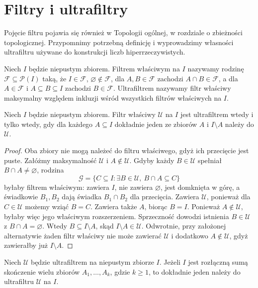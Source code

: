 \section{Filtry i ultrafiltry}
\label{ma1:sec:ultrafilters}
Pojęcie filtru pojawia się również w Topologii ogólnej, w rozdziale o zbieżności topologicznej. Przypomnimy potrzebną definicję i wyprowadzimy własności ultrafiltru używane do konstrukcji liczb hiperrzeczywistych.
\begin{definicja}
\label{ma1:def:ultrafilter}
Niech $I$ będzie niepustym zbiorem. Filtrem właściwym na $I$ nazywamy rodzinę $\mathcal F\subseteq\mathcal P(I)$ taką, że $I\in\mathcal F$, $\varnothing\notin\mathcal F$, dla $A,B\in\mathcal F$ zachodzi $A\cap B\in\mathcal F$, a dla $A\in\mathcal F$ i $A\subseteq B\subseteq I$ zachodzi $B\in\mathcal F$. Ultrafiltrem nazywamy filtr właściwy maksymalny względem inkluzji wśród wszystkich filtrów właściwych na $I$.
\end{definicja}
\begin{lemat}
\label{ma1:lem:ultrafilter-alternative}
Niech $I$ będzie niepustym zbiorem. Filtr właściwy $\mathcal U$ na $I$ jest ultrafiltrem wtedy i tylko wtedy, gdy dla każdego $A\subseteq I$ dokładnie jeden ze zbiorów $A$ i $I\setminus A$ należy do $\mathcal U$.
\end{lemat}
\begin{proof}
Oba zbiory nie mogą należeć do filtru właściwego, gdyż ich przecięcie jest puste. Załóżmy maksymalność $\mathcal U$ i $A\notin\mathcal U$. Gdyby każdy $B\in\mathcal U$ spełniał $B\cap A\ne\varnothing$, rodzina
\[
 \mathcal G=\{C\subseteq I:\exists B\in\mathcal U,\ B\cap A\subseteq C\}
\]
byłaby filtrem właściwym: zawiera $I$, nie zawiera $\varnothing$, jest domknięta w górę, a świadkowie $B_1,B_2$ dają świadka $B_1\cap B_2$ dla przecięcia. Zawiera $\mathcal U$, ponieważ dla $C\in\mathcal U$ możemy wziąć $B=C$. Zawiera także $A$, biorąc $B=I$. Ponieważ $A\notin\mathcal U$, byłaby więc jego właściwym rozszerzeniem. Sprzeczność dowodzi istnienia $B\in\mathcal U$ z $B\cap A=\varnothing$. Wtedy $B\subseteq I\setminus A$, skąd $I\setminus A\in\mathcal U$.
Odwrotnie, przy założonej alternatywie żaden filtr właściwy nie może zawierać $\mathcal U$ i dodatkowo $A\notin\mathcal U$, gdyż zawierałby już $I\setminus A$.
\end{proof}
\begin{wniosek}
\label{ma1:cor:ultrafilter-partition}
Niech $\mathcal U$ będzie ultrafiltrem na niepustym zbiorze $I$. Jeżeli $I$ jest rozłączną sumą skończenie wielu zbiorów $A_1,\ldots,A_k$, gdzie $k\ge1$, to dokładnie jeden należy do ultrafiltru $\mathcal U$ na $I$.
\end{wniosek}
